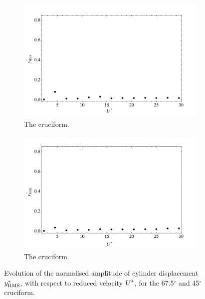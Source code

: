 \documentclass[oneside]{utmthesis}
\begin{document}
\begin{figure}
  \centering
  \begin{subfigure}[h]{1\textwidth}
    \includegraphics[width=\textwidth]{figs/yStrRMS2}
  \caption{The \angfo{} cruciform.}
    \label{fig:yStrRMS2}
  \end{subfigure}
  
  \begin{subfigure}[h]{1\textwidth}
    \includegraphics[width=\textwidth]{figs/yStrRMS3}
    \caption{The \angth{} cruciform.}
    \label{fig:yStrRMS3}
  \end{subfigure}

  \caption{Evolution of the normalised \rms{} amplitude of cylinder displacement $y^{*}_{\text{RMS}}$, with respect to reduced velocity $U^{*}$, for the 67.5$^{\circ}$ and 45$^{\circ}$ cruciform.}
  \label{fig:yStrRMS23}
\end{figure}
\end{document}
